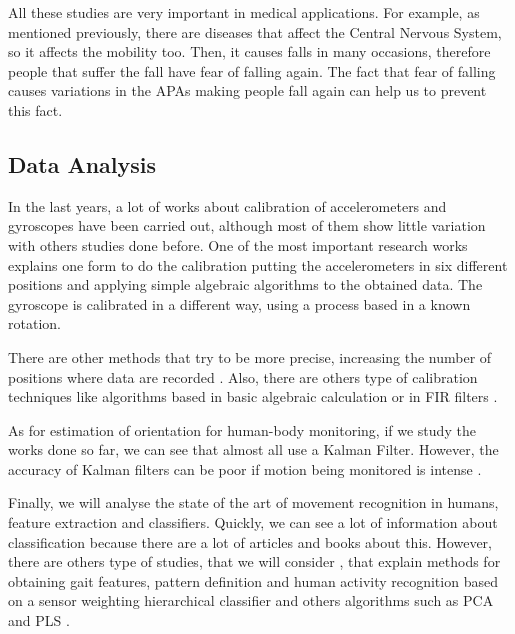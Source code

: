 All these studies are very important in medical applications. For example, as mentioned previously, there are diseases that affect the Central Nervous System, so it affects the mobility too. Then, it causes falls in many occasions, therefore  people that suffer the fall have fear of falling again. The fact that fear of falling causes variations in the APAs making people fall again can help us to prevent this fact.

\subsection{Data Analysis}

In the last years, a lot of works about  calibration of accelerometers and gyroscopes have been carried out, although most of them show little variation with others studies done before. One of the most important research works  \cite{Kian2011} explains one form to do the calibration putting the accelerometers in six different positions and applying simple algebraic algorithms to the obtained data. The gyroscope is calibrated in a different way, using a process based in a known rotation. 

There are other methods that try to be more precise, increasing the number of positions where data are recorded \cite{Camps2009}. Also, there are others type of calibration techniques like algorithms based in basic algebraic calculation or in FIR filters \cite{A.Olivares2013}.

As for estimation of orientation for human-body monitoring, if we study the works done so far, we can see that almost all  use a Kalman Filter. However, the accuracy of Kalman filters can be poor if motion being monitored is intense \cite{A.Olivares2013}.

Finally, we will analyse the state of the art of movement recognition in humans, feature extraction and classifiers. Quickly, we can see a lot of information about classification because there are a lot of articles and books about this. However, there are others type of studies, that we will consider \cite{FrenkelToledo} \cite{Jeon}\cite{Banos2012}, that explain methods for obtaining gait features, pattern definition and human activity recognition based on a sensor weighting hierarchical classifier and others algorithms such as PCA and PLS \cite{Gorriz} \cite{pls_pca}. 
